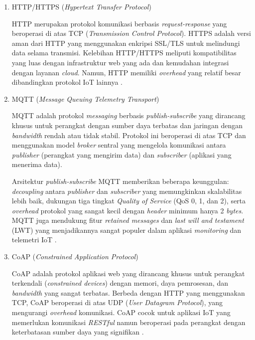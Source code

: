 \begin{enumerate}
  \item HTTP/HTTPS (\textit{Hypertext Transfer Protocol})

  HTTP merupakan protokol komunikasi berbasis \textit{request-response} yang beroperasi di atas TCP (\textit{Transmission Control Protocol}). HTTPS adalah versi aman dari HTTP yang menggunakan enkripsi SSL/TLS untuk melindungi data selama transmisi. Kelebihan HTTP/HTTPS meliputi kompatibilitas yang luas dengan infrastruktur web yang ada dan kemudahan integrasi dengan layanan \textit{cloud}. Namun, HTTP memiliki \textit{overhead} yang relatif besar dibandingkan protokol IoT lainnya \autocite{alfuqaha2015}.

  \item MQTT (\textit{Message Queuing Telemetry Transport})

  MQTT adalah protokol \textit{messaging} berbasis \textit{publish-subscribe} yang dirancang khusus untuk perangkat dengan sumber daya terbatas dan jaringan dengan \textit{bandwidth} rendah atau tidak stabil. Protokol ini beroperasi di atas TCP dan menggunakan model \textit{broker} sentral yang mengelola komunikasi antara \textit{publisher} (perangkat yang mengirim data) dan \textit{subscriber} (aplikasi yang menerima data).

  Arsitektur \textit{publish-subscribe} MQTT memberikan beberapa keunggulan: \textit{decoupling} antara \textit{publisher} dan \textit{subscriber} yang memungkinkan skalabilitas lebih baik, dukungan tiga tingkat \textit{Quality of Service} (QoS 0, 1, dan 2), serta \textit{overhead} protokol yang sangat kecil dengan \textit{header} minimum hanya 2 \textit{bytes}. MQTT juga mendukung fitur \textit{retained messages} dan \textit{last will and testament} (LWT) yang menjadikannya sangat populer dalam aplikasi \textit{monitoring} dan telemetri IoT \autocite{alfuqaha2015}.

  \item CoAP (\textit{Constrained Application Protocol})

  CoAP adalah protokol aplikasi web yang dirancang khusus untuk perangkat terkendali (\textit{constrained devices}) dengan memori, daya pemrosesan, dan \textit{bandwidth} yang sangat terbatas. Berbeda dengan HTTP yang menggunakan TCP, CoAP beroperasi di atas UDP (\textit{User Datagram Protocol}), yang mengurangi \textit{overhead} komunikasi. CoAP cocok untuk aplikasi IoT yang memerlukan komunikasi \textit{RESTful} namun beroperasi pada perangkat dengan keterbatasan sumber daya yang signifikan \autocite{alfuqaha2015}.
\end{enumerate}

